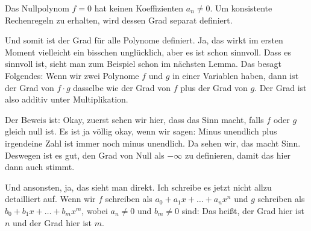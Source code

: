 \begin{math-stroke}

\begin{explanation-of-steps}
Das Nullpolynom $f=0$ hat keinen Koeffizienten $a_n \neq 0$. Um konsistente Rechenregeln zu erhalten, wird dessen Grad separat definiert.
\end{explanation-of-steps}

\end{math-stroke}

\begin{spoken-clean}[00:08:00 - 00:10:40]
Und somit ist der Grad für alle Polynome definiert. Ja, das wirkt im ersten Moment vielleicht ein bisschen unglücklich, aber es ist schon sinnvoll. Dass es sinnvoll ist, sieht man zum Beispiel schon im nächsten Lemma. Das besagt Folgendes: Wenn wir zwei Polynome $f$ und $g$ in einer Variablen haben, dann ist der Grad von $f \cdot g$ dasselbe wie der Grad von $f$ plus der Grad von $g$. Der Grad ist also additiv unter Multiplikation.

Der Beweis ist: Okay, zuerst sehen wir hier, dass das Sinn macht, falls $f$ oder $g$ gleich null ist. Es ist ja völlig okay, wenn wir sagen: Minus unendlich plus irgendeine Zahl ist immer noch minus unendlich. Da sehen wir, das macht Sinn. Deswegen ist es gut, den Grad von Null als $-\infty$ zu definieren, damit das hier dann auch stimmt.

Und ansonsten, ja, das sieht man direkt. Ich schreibe es jetzt nicht allzu detailliert auf. Wenn wir $f$ schreiben als $a_0 + a_1 x + \dots + a_n x^n$ und $g$ schreiben als $b_0 + b_1 x + \dots + b_m x^m$, wobei $a_n \neq 0$ und $b_m \neq 0$ sind: Das heißt, der Grad hier ist $n$ und der Grad hier ist $m$.
\end{spoken-clean}

